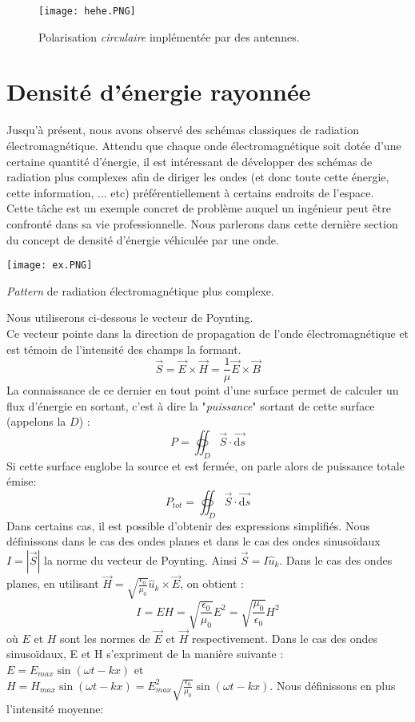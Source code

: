 \begin{figure}[h]\centering
\texttt{[image: hehe.PNG]}
\caption{Polarisation \textit{circulaire} implémentée par des antennes.}
\label{fig:circ}
\end{figure}

\section{Densité d'énergie rayonnée}

Jusqu'à présent, nous avons observé des schémas classiques de radiation électromagnétique. Attendu que chaque onde électromagnétique soit dotée d'une certaine quantité d'énergie, il est intéressant de développer des schémas de radiation plus complexes afin de diriger les ondes (et donc toute cette énergie, cette information, ... etc) préférentiellement à certains endroits de l'espace.\\ Cette tâche est un exemple concret de problème auquel un ingénieur peut être confronté dans sa vie professionnelle. Nous parlerons dans cette dernière section du concept de densité d'énergie véhiculée par une onde.
\begin{marginfigure}
	\centering
\texttt{[image: ex.PNG]}
\caption{\textit{Pattern} de radiation électromagnétique plus complexe.}
\label{fig:pattern}
\end{marginfigure}

Nous utiliserons ci-dessous le vecteur de Poynting.\\ Ce vecteur pointe dans la direction de propagation de l'onde électromagnétique et est témoin de l'intensité des champs la formant. 
$$ \vec{S} = \vec{E}\times \vec{H} = \frac{1}{\mu} \vec{E}\times \vec{B} $$
La connaissance de ce dernier en tout point d'une surface permet de calculer un flux d'énergie en sortant, c'est à dire la "\textit{puissance}" sortant de cette surface (appelons la $D$) : 
$$ P = \oiint_{D} \vec{S}\cdot \vec{\textrm{d}s}$$
Si cette surface englobe la source et est fermée, on parle alors de puissance totale émise: 
$$P_{tot}=\oiint_D\vec{S}\cdot \vec{\textrm{d}s}$$
Dans certains cas, il est possible d'obtenir des expressions simplifiés.
Nous définissons dans le cas des ondes planes et dans le cas des ondes sinusoïdaux $I=|\vec{S}|$ la norme du vecteur de Poynting. Ainsi $\vec{S}=I \hat{u}_k$. 
Dans le cas des ondes planes, en utilisant $\vec{H}=\sqrt{\frac{\epsilon_{0}}{\mu_0}}\hat{u}_k \times \vec{E}$, on obtient : 
$$ I=EH=\sqrt{\frac{\epsilon_{0}}{\mu_0}}E^2=\sqrt{\frac{\mu_0}{\epsilon_{0}}}H^2$$
où $E$ et $H$ sont les normes de $\vec{E}$ et $\vec{H}$ respectivement.
Dans le cas des ondes sinusoïdaux, E et H s'expriment de la manière suivante : $E=E_{max}\sin(\omega t-kx)$ et $H=H_{max}\sin(\omega t-kx)=E_{max}^2\sqrt{\frac{\epsilon_0}{\mu_0}}\sin(\omega t-kx)$. Nous définissons en plus l'intensité moyenne:
 

